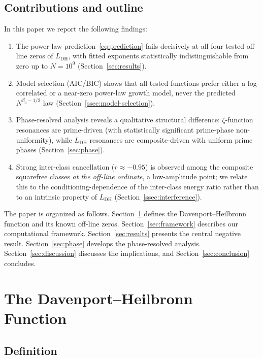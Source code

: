\documentclass[11pt]{amsart}
\theoremstyle{definition}
\theoremstyle{remark}
\renewcommand{\DH}{\mathrm{DH}}
\begin{document}
\subsection{Contributions and outline}

In this paper we report the following findings:
\begin{enumerate}
  \item The power-law prediction~\eqref{eq:prediction} fails
    decisively at all four tested off-line zeros of $L_{\DH}$, with
    fitted exponents statistically indistinguishable from zero up to
    $N = 10^9$ (Section~\ref{sec:results}).
  \item Model selection (AIC/BIC) shows that all tested functions
    prefer either a log-correlated or a near-zero power-law growth
    model, never the predicted $N^{\beta_0 - 1/2}$ law
    (Section~\ref{ssec:model-selection}).
  \item Phase-resolved analysis reveals a qualitative structural
    difference: $\zeta$-function resonances are prime-driven (with
    statistically significant prime-phase non-uniformity), while
    $L_{\DH}$ resonances are composite-driven with uniform prime
    phases (Section~\ref{sec:phase}).
  \item Strong inter-class cancellation ($r\approx-0.95$) is observed
    among the composite squarefree classes \emph{at the off-line
    ordinate}, a low-amplitude point; we relate this to the
    conditioning-dependence of the inter-class energy ratio rather than to
    an intrinsic property of $L_{\DH}$ (Section~\ref{ssec:interference}).
\end{enumerate}

The paper is organized as follows.  Section~\ref{sec:DH} defines the
Davenport--Heilbronn function and its known off-line zeros.
Section~\ref{sec:framework} describes our computational framework.
Section~\ref{sec:results} presents the central negative result.
Section~\ref{sec:phase} develops the phase-resolved analysis.
Section~\ref{sec:discussion} discusses the implications, and
Section~\ref{sec:conclusion} concludes.

\section{The Davenport--Heilbronn Function}\label{sec:DH}

\subsection{Definition}
\end{document}
